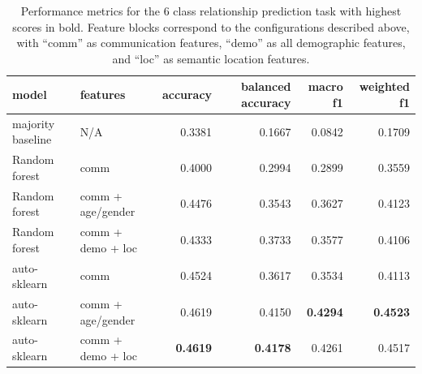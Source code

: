 \documentclass[acmlarge]{acmart}
\begin{document}
\begin{table}[h]
    \centering
    \begin{tabular}{llrrrr}
        \toprule
        model & features & accuracy &  balanced accuracy &  macro f1 &  weighted f1 \\
        \midrule
        majority baseline & N/A &   0.3381 &             0.1667 &    0.0842 &       0.1709 \\
        \midrule
         Random forest &  comm &  0.4000 &             0.2994 &    0.2899 &       0.3559 \\
         Random forest & comm + age/gender & 0.4476 &             0.3543 &    0.3627 &       0.4123 \\
         Random forest & comm + demo + loc  & 0.4333 &             0.3733 &    0.3577 &       0.4106 \\
        \hline
        auto-sklearn  & comm & 0.4524 &             0.3617 &    0.3534 &       0.4113 \\
        auto-sklearn & comm + age/gender &  0.4619 &             0.4150 &    \textbf{0.4294} &       \textbf{0.4523} \\
        auto-sklearn & comm + demo + loc & \textbf{0.4619} &  \textbf{0.4178} &    0.4261 &       0.4517 \\
        \bottomrule
    \end{tabular}
    \caption{Performance metrics for the 6 class relationship prediction task with highest scores in bold. Feature blocks correspond to the configurations described above, with ``comm'' as communication features, ``demo'' as all demographic features, and ``loc'' as semantic location features.}
    \label{tab:top5_6class_metrics}
\end{table}
\end{document}
